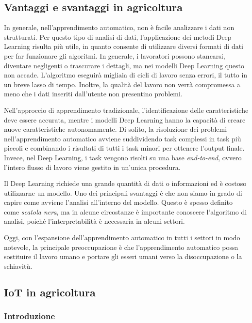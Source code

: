 \subsection{Vantaggi e svantaggi in agricoltura}

In generale, nell'apprendimento automatico, non è facile analizzare i dati non strutturati. Per questo tipo di analisi di dati, l'applicazione dei metodi Deep Learning risulta più utile, in quanto consente di utilizzare diversi formati di dati per far funzionare gli algoritmi. In generale, i lavoratori possono stancarsi, diventare negligenti o trascurare i dettagli, ma nei modelli Deep Learning questo non accade. L'algoritmo eseguirà migliaia di cicli di lavoro senza errori, il tutto in un breve lasso di tempo. Inoltre, la qualità del lavoro non verrà compromessa a meno che i dati inseriti dall'utente non presentino problemi.

Nell'approccio di apprendimento tradizionale, l'identificazione delle caratteristiche deve essere accurata, mentre i modelli Deep Learning hanno la capacità di creare nuove caratteristiche autonomamente. Di solito, la risoluzione dei problemi nell'apprendimento automatico avviene suddividendo task complessi in task più piccoli e combinando i risultati di tutti i task minori per ottenere l'output finale. Invece, nel Deep Learning, i task vengono risolti su una base \textit{end-to-end}, ovvero l'intero flusso di lavoro viene gestito in un'unica procedura.

Il Deep Learning richiede una grande quantità di dati o informazioni ed è costoso utilizzarne un modello. Uno dei principali svantaggi è che non siamo in grado di capire come avviene l'analisi all'interno del modello. Questo è spesso definito come \textit{scatola nera}, ma in alcune circostanze è importante conoscere l'algoritmo di analisi, poiché l'interpretabilità è necessaria in alcuni settori.

Oggi, con l'espansione dell'apprendimento automatico in tutti i settori in modo notevole, la principale preoccupazione è che l'apprendimento automatico possa sostituire il lavoro umano e portare gli esseri umani verso la disoccupazione o la schiavitù.

\subsection{IoT in agricoltura}
\subsubsection{Introduzione}

